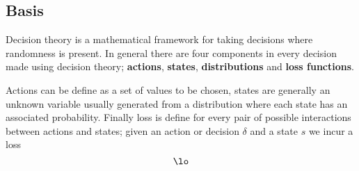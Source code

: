 \documentclass[../main.tex]{subfiles}
\begin{document}
\subsection{Basis}
Decision theory is a mathematical framework for taking decisions where randomness is present. In general there are four components in every decision made using decision theory; \textbf{actions}, \textbf{states}, \textbf{distributions} and \textbf{loss functions}.

Actions can be define as a set of values to be chosen, states are generally an unknown variable usually generated from a distribution where each state has an associated probability. Finally loss is define for every pair of possible interactions between actions and states; given an action or decision $\delta$ and a state $s$ we incur a loss 
\begin{equation*}
    \lo
\end{equation*}
\end{document}
